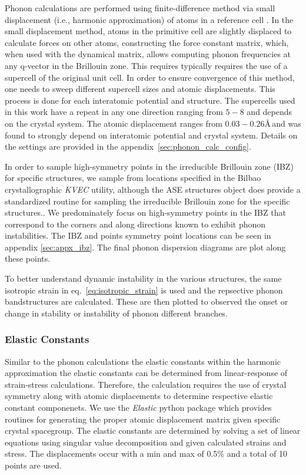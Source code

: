 \documentclass[preprint,colorlinks=true,linkcolor=black,citecolor=black]{elsarticle}
\begin{document}
Phonon calculations are performed using finite-difference method via small displacement (i.e., harmonic approximation) of atoms in a reference cell \cite{Alfe2009}. In the small displacement method, atoms in the primitive cell are slightly displaced to calculate forces on other atoms, constructing the force constant matrix, which, when used with the dynamical matrix, allows computing phonon frequencies at any q-vector in the Brillouin zone. This requires typically requires the use of a supercell of the original unit cell. In order to ensure convergence of this method, one needs to sweep different supercell sizes and atomic displacements. This process is done for each interatomic potential and structure. The supercells used in this work  have a repeat in any one direction ranging from $5-8$ and depends on the crystal system. The atomic displacement ranges from $0.03-0.26$\AA\,and was found to strongly depend on interatomic potential and crystal system. Details on the settings are provided in the appendix~\ref{sec:phonon_calc_config}. \par

In order to sample high-symmetry points in the irreducible Brillouin zone (IBZ) for specific structures, we sample from locations specified in the Bilbao crystallographic \textit{KVEC} utility\cite{Aroyo2014}, although the ASE structures object does provide a standardized routine for sampling the irreducible Brillouin zone for the specific structures.\cite{Setyawan2010}. We predominately focus on high-symmetry points in the IBZ that correspond to the corners and along directions known to exhibit phonon instabilities. The IBZ and points symmetry point locations can be seen in appendix \ref{sec:appx_ibz}. The final phonon dispersion diagrams are plot along these points. \par

To better understand dynamic instability in the various structures, the same isotropic strain in eq.~\ref{eq:isotropic_strain} is used and the repsective phonon bandstructures are calculated. These are then plotted to observed the onset or change in stability or instability of phonon different branches. \par

\subsubsection{Elastic Constants}

Similar to the phonon calculations the elastic constants within the harmonic approximation the elastic constants can be determined from linear-response of strain-stress calculations. Therefore, the calculation requires the use of crystal symmetry along with atomic displacements to determine respective elastic constant componenets. We use the \textit{Elastic}\cite{Jochym2018} python package which provides routines for generating the proper atomic displacement matrix given specific crystal spacegroup. The elastic constants are determined by solving a set of linear equations using singular value decomposition and given calculated strains and stress. The displacements occur with a min and max of 0.5\% and a total of 10 points are used. \par
\end{document}
